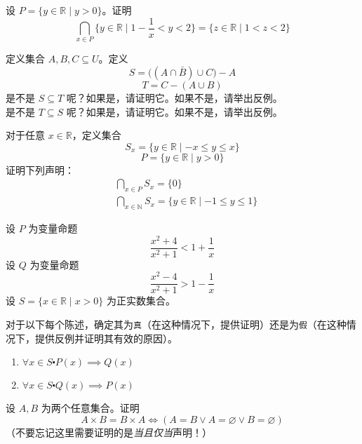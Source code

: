 \begin{exercise}
    设 $P = \{y \in \mathbb{R} \mid y > 0\}$。证明
    \[\bigcap_{x \in P} \Big\{y \in \mathbb{R} \mid 1-\frac{1}{x} < y < 2\Big\} = \{z \in \mathbb{R} \mid 1 < z <2\}\]
\end{exercise}

\begin{exercise}
    定义集合 $A, B, C \subseteq U$。定义
    \[S = \big((A \cap \bar{B}) \cup C \big)-A\]
    \[T = C-(A \cup B)\]
    是不是 $S \subseteq T$ 呢？如果是，请证明它。如果不是，请举出反例。\\
    是不是 $T \subseteq S$ 呢？如果是，请证明它。如果不是，请举出反例。
\end{exercise}

\begin{exercise}
    对于任意 $x \in \mathbb{R}$，定义集合
    \[S_x = \{y \in \mathbb{R} \mid -x \le y \le x\}\]
    \[P = \{y \in \mathbb{R} \mid y > 0\}\]
    证明下列声明：
    \begin{align*}
        &\bigcap_{x \in P} S_x = \{0\} \\
        &\bigcap_{x \in \mathbb{N}} S_x = \{y \in \mathbb{R} \mid -1 \le y \le 1\}
    \end{align*}
\end{exercise}

\begin{exercise} \label{exc:exercises4.11.22}
    设 $P$ 为变量命题
    \[\frac{x^2+4}{x^2+1} < 1+\frac{1}{x}\]
    设 $Q$ 为变量命题
    \[\frac{x^2-4}{x^2+1} > 1-\frac{1}{x}\]
    设 $S = \{x \in \mathbb{R} \mid x > 0\}$ 为正实数集合。

    对于以下每个陈述，确定其为\verb|真|（在这种情况下，提供证明）还是为\verb|假|（在这种情况下，提供反例并证明其有效的原因）。

    \begin{enumerate}[label=(\alph*)]
        \item $\forall x \in S \centerdot P(x) \implies Q(x)$
        \item $\forall x \in S \centerdot Q(x) \implies P(x)$
    \end{enumerate}  
\end{exercise}

\begin{exercise}
    设 $A, B$ 为两个任意集合。证明
    \[A \times B = B \times A \iff (A = B \lor A = \varnothing \lor B = \varnothing)\]
    （不要忘记这里需要证明的是\emph{当且仅当}声明！）
\end{exercise}

